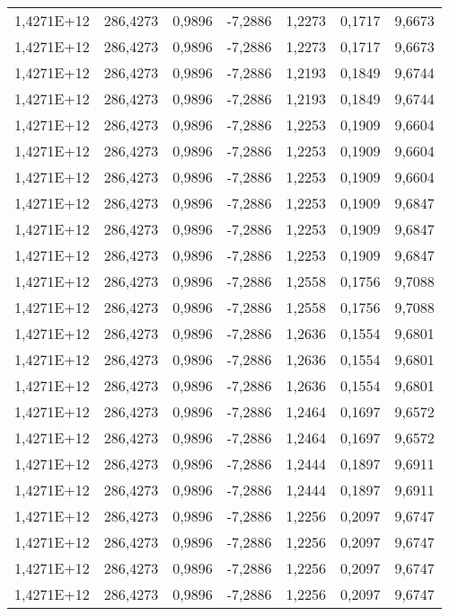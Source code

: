 \begin{table}[htbp]
\begin{tabular}{rrrrrrr}
    1,4271E+12 & 286,4273 & 0,9896 & -7,2886 & 1,2273 & 0,1717 & 9,6673 \\
    1,4271E+12 & 286,4273 & 0,9896 & -7,2886 & 1,2273 & 0,1717 & 9,6673 \\
    1,4271E+12 & 286,4273 & 0,9896 & -7,2886 & 1,2193 & 0,1849 & 9,6744 \\
    1,4271E+12 & 286,4273 & 0,9896 & -7,2886 & 1,2193 & 0,1849 & 9,6744 \\
    1,4271E+12 & 286,4273 & 0,9896 & -7,2886 & 1,2253 & 0,1909 & 9,6604 \\
    1,4271E+12 & 286,4273 & 0,9896 & -7,2886 & 1,2253 & 0,1909 & 9,6604 \\
    1,4271E+12 & 286,4273 & 0,9896 & -7,2886 & 1,2253 & 0,1909 & 9,6604 \\
    1,4271E+12 & 286,4273 & 0,9896 & -7,2886 & 1,2253 & 0,1909 & 9,6847 \\
    1,4271E+12 & 286,4273 & 0,9896 & -7,2886 & 1,2253 & 0,1909 & 9,6847 \\
    1,4271E+12 & 286,4273 & 0,9896 & -7,2886 & 1,2253 & 0,1909 & 9,6847 \\
    1,4271E+12 & 286,4273 & 0,9896 & -7,2886 & 1,2558 & 0,1756 & 9,7088 \\
    1,4271E+12 & 286,4273 & 0,9896 & -7,2886 & 1,2558 & 0,1756 & 9,7088 \\
    1,4271E+12 & 286,4273 & 0,9896 & -7,2886 & 1,2636 & 0,1554 & 9,6801 \\
    1,4271E+12 & 286,4273 & 0,9896 & -7,2886 & 1,2636 & 0,1554 & 9,6801 \\
    1,4271E+12 & 286,4273 & 0,9896 & -7,2886 & 1,2636 & 0,1554 & 9,6801 \\
    1,4271E+12 & 286,4273 & 0,9896 & -7,2886 & 1,2464 & 0,1697 & 9,6572 \\
    1,4271E+12 & 286,4273 & 0,9896 & -7,2886 & 1,2464 & 0,1697 & 9,6572 \\
    1,4271E+12 & 286,4273 & 0,9896 & -7,2886 & 1,2444 & 0,1897 & 9,6911 \\
    1,4271E+12 & 286,4273 & 0,9896 & -7,2886 & 1,2444 & 0,1897 & 9,6911 \\
    1,4271E+12 & 286,4273 & 0,9896 & -7,2886 & 1,2256 & 0,2097 & 9,6747 \\
    1,4271E+12 & 286,4273 & 0,9896 & -7,2886 & 1,2256 & 0,2097 & 9,6747 \\
    1,4271E+12 & 286,4273 & 0,9896 & -7,2886 & 1,2256 & 0,2097 & 9,6747 \\
    1,4271E+12 & 286,4273 & 0,9896 & -7,2886 & 1,2256 & 0,2097 & 9,6747 \\

\end{tabular}
\end{table}
